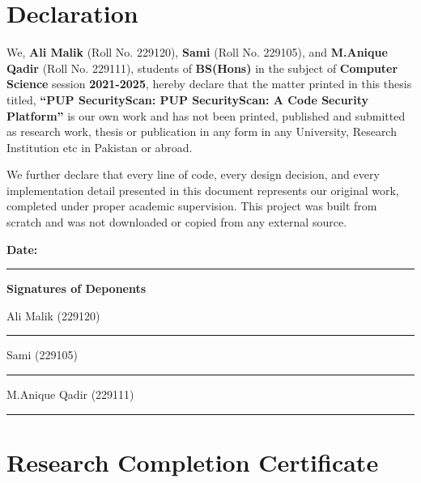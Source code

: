 \documentclass[12pt,a4paper]{report}
\begin{document}

\chapter*{Declaration}

We, \textbf{Ali Malik} (Roll No. 229120), \textbf{Sami} (Roll No. 229105), and \textbf{M.Anique Qadir} (Roll No. 229111), students of \textbf{BS(Hons)} in the subject of \textbf{Computer Science} session \textbf{2021-2025}, hereby declare that the matter printed in this thesis titled, \textbf{``PUP SecurityScan:  PUP SecurityScan: A Code Security Platform''} is our own work and has not been printed, published and submitted as research work, thesis or publication in any form in any University, Research Institution etc in Pakistan or abroad.

We further declare that every line of code, every design decision, and every implementation detail presented in this document represents our original work, completed under proper academic supervision. This project was built from scratch and was not downloaded or copied from any external source.

\vspace{3cm}

\noindent\textbf{Date:} \rule{3cm}{0.4pt} \hfill \textbf{Signatures of Deponents}

\vspace{1cm}
\noindent\hfill Ali Malik (229120) \rule{4cm}{0.4pt}

\vspace{0.5cm}
\noindent\hfill Sami (229105) \rule{4cm}{0.4pt}

\vspace{0.5cm}
\noindent\hfill M.Anique Qadir (229111) \rule{4cm}{0.4pt}

\chapter*{Research Completion Certificate}
\end{document}
